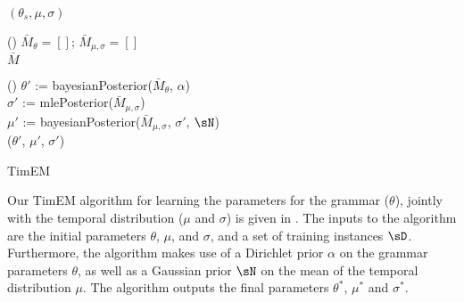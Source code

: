 \begin{algorithm}[t]
	\BlankLine

	\KwRet $(\theta_s,\mu,\sigma)$ \\
	\BlankLine
	\BlankLine

	\Begin(\estep{$\sD$,$\theta$,$\mu$,$\sigma$}){
		$\bar M_\theta = []$; $\bar M_{\mu,\sigma} = []$ \\
		\KwRet $\bar M$ \\
	}
	\BlankLine
	\BlankLine
	
	\Begin(){
		$\theta'$ := bayesianPosterior($\bar M_\theta$, $\alpha$) \\
		$\sigma'$ := mlePosterior($\bar M_{\mu,\sigma}$) \\
		$\mu'$ := bayesianPosterior($\bar M_{\mu,\sigma}$, $\sigma'$, $\sN$) \\
		\KwRet ($\theta'$, $\mu'$, $\sigma'$) \\
	}
	\caption{
		\label{alg:pseudocode}
		TimEM 
	}
\end{algorithm}

Our TimEM algorithm for learning the parameters for the grammar ($\theta$),
	jointly with the temporal distribution ($\mu$ and $\sigma$) is given 
	in .
The inputs to the algorithm are the initial parameters $\theta$, $\mu$, and
	$\sigma$, and a set of training instances $\sD$.
Furthermore, the algorithm makes use of a Dirichlet prior $\alpha$ on 
	the grammar parameters $\theta$, as well as a Gaussian prior $\sN$ on the
	mean of the temporal distribution $\mu$.
The algorithm outputs the final parameters $\theta^*$, $\mu^*$ and $\sigma^*$.


